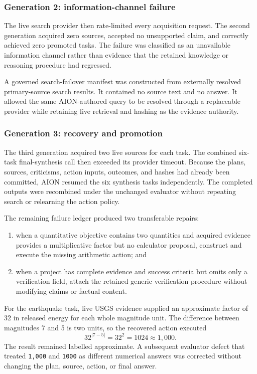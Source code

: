 \subsubsection{Generation 2: information-channel failure}

The live search provider then rate-limited every acquisition request.  The
second generation acquired zero sources, accepted no unsupported claim, and
correctly achieved zero promoted tasks.  The failure was classified as an
unavailable information channel rather than evidence that the retained
knowledge or reasoning procedure had regressed.

A governed search-failover manifest was constructed from externally resolved
primary-source search results.  It contained no source text and no answer.  It
allowed the same AION-authored query to be resolved through a replaceable
provider while retaining live retrieval and hashing as the evidence authority.

\subsubsection{Generation 3: recovery and promotion}

The third generation acquired two live sources for each task.  The combined
six-task final-synthesis call then exceeded its provider timeout.  Because the
plans, sources, criticisms, action inputs, outcomes, and hashes had already been
committed, AION resumed the six synthesis tasks independently.  The completed
outputs were recombined under the unchanged evaluator without repeating search
or relearning the action policy.

The remaining failure ledger produced two transferable repairs:
\begin{enumerate}
  \item when a quantitative objective contains two quantities and acquired
        evidence provides a multiplicative factor but no calculator proposal,
        construct and execute the missing arithmetic action; and
  \item when a project has complete evidence and success criteria but omits
        only a verification field, attach the retained generic verification
        procedure without modifying claims or factual content.
\end{enumerate}

For the earthquake task, live USGS evidence supplied an approximate factor of
32 in released energy for each whole magnitude unit.  The difference between
magnitudes 7 and 5 is two units, so the recovered action executed
\begin{equation}
32^{\lvert 7-5\rvert}=32^2=1024\approx 1{,}000.
\label{eq:arena-v2-earthquake-recovery}
\end{equation}
The result remained labelled approximate.  A subsequent evaluator defect that
treated \texttt{1,000} and \texttt{1000} as different numerical answers was
corrected without changing the plan, source, action, or final answer.


